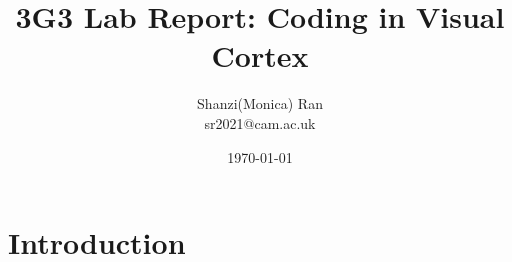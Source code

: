\documentclass[11pt, twocolumn]{article}
\begin{document}
\title{\Large \textbf{3G3 Lab Report: Coding in Visual Cortex}}
\author{Shanzi(Monica) Ran\\
sr2021@cam.ac.uk}
\date{\small \today}
\maketitle

\section{Introduction}
\end{document}
